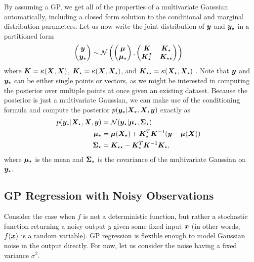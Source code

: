 By assuming a GP, we get all of the properties of a multivariate Gaussian
automatically, including a closed form solution to the conditional and marginal
distribution parameters. Let us now write the joint distribution of ${\boldsymbol{y}}$ and ${\boldsymbol{y}}_\star$ in
a partitioned form
$$
\begin{pmatrix} {\boldsymbol{y}} \\ {\boldsymbol{y}}_\star \end{pmatrix} \sim \mathcal{N}\begin{pmatrix}
  \begin{pmatrix} {\boldsymbol{\mu}} \\ {\boldsymbol{\mu}}_\star \end{pmatrix},
  \begin{pmatrix} {\bm{K}} & {\bm{K}}_\star \\ {\bm{K}}_\star^T & {\bm{K}}_{\star\star} \end{pmatrix}
  \end{pmatrix}
$$
where ${\bm{K}} = \kappa({\bm{X}}, {\bm{X}})$, ${\bm{K}}_\star = \kappa({\bm{X}}, {\bm{X}}_\star)$, and
${\bm{K}}_{\star\star} = \kappa({\bm{X}}_\star, {\bm{X}}_\star)$ \citep{williams2006gaussian}.
Note that ${\boldsymbol{y}}$ and ${\boldsymbol{y}}_\star$ can be either single points or
vectors, as we might be interested in computing the posterior over multiple
points at once given an existing dataset.  Because the posterior is just a multivariate
Gaussian, we can make use of the conditioning formula and compute the posterior
$p({\boldsymbol{y}}_\star | {\bm{X}}_\star, {\bm{X}}, {\boldsymbol{y}})$ exactly as
\begin{align}
  p({\boldsymbol{y}}_\star | {\bm{X}}_\star, {\bm{X}}, {\boldsymbol{y}}) &= \mathcal{N}({\boldsymbol{y}}_\star | {\boldsymbol{\mu}}_\star, {\bm{\Sigma}}_\star)
  \\
  {\boldsymbol{\mu}}_\star &= {\boldsymbol{\mu}}({\bm{X}}_\star) + {\bm{K}}_\star^T {\bm{K}}^{-1} ({\boldsymbol{y}} - {\boldsymbol{\mu}}({\bm{X}}))
  \\
  {\bm{\Sigma}}_\star &= {\bm{K}}_{\star\star} - {\bm{K}}_\star^T {\bm{K}}^{-1} {\bm{K}}_\star,
\end{align}
where ${\boldsymbol{\mu}}_\star$ is the mean and ${\bm{\Sigma}}_\star$ is the covariance of the multivariate
Gaussian on~${\boldsymbol{y}}_\star$.

\subsection{GP Regression with Noisy Observations}

Consider the case when $f$ is not a deterministic function, but rather a
stochastic function returning a noisy output $y$ given some fixed input
${\boldsymbol{x}}$ (in other words, $f({\boldsymbol{x}})$ is a random variable). GP regression is flexible enough
to model Gaussian noise in the output directly. For now, let us consider the noise
having a fixed variance $\sigma^2$.

